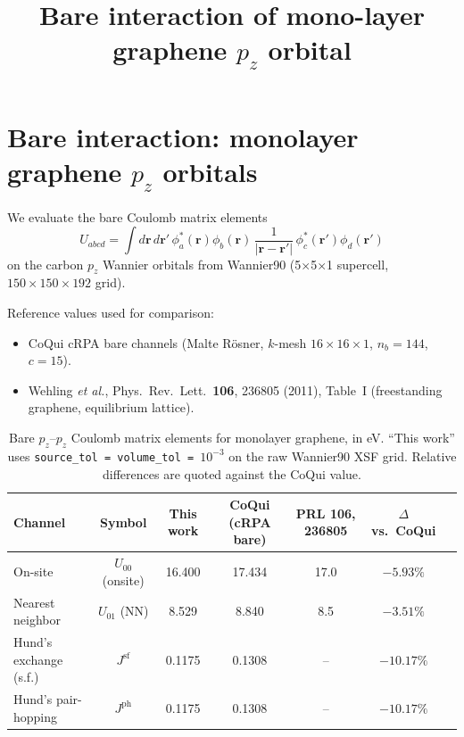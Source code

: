 \documentclass[prb,preprintnumbers,amsmath,amssymb, 11pt]{revtex4}
\newcommand{\V}[1]{\boldsymbol{#1}} %
\begin{document}

\title{Bare interaction of mono-layer graphene $p_z$ orbital}
\author{}

\maketitle

\section{Bare interaction: monolayer graphene $p_z$ orbitals}

We evaluate the bare Coulomb matrix elements
\begin{equation}
  U_{abcd}=\int d\V r\,d\V r'\,\phi_a^*(\V r)\phi_b(\V r)\,\frac{1}{|\V r-\V r'|}\,\phi^*_c(\V r')\phi_d(\V r')
\end{equation}
on the carbon $p_z$ Wannier orbitals from Wannier90 (5$\times$5$\times$1 supercell, $150\times150\times192$ grid). 

Reference values used for comparison:
\begin{itemize}
  \item CoQui cRPA bare channels (Malte R\"osner, $k$-mesh $16\times16\times1$, $n_b{=}144$, $c{=}15$).
  \item Wehling \emph{et al.}, Phys.~Rev.~Lett.~\textbf{106}, 236805 (2011), Table~I (freestanding graphene, equilibrium lattice).
\end{itemize}

\begin{table}[h]
\centering
\caption{Bare $p_z$--$p_z$ Coulomb matrix elements for monolayer graphene, in eV. ``This work'' uses \texttt{source\_tol = volume\_tol = $10^{-3}$} on the raw Wannier90 XSF grid. Relative differences are quoted against the CoQui value.}
\label{tab:mlg_bare}
\begin{tabular}{lcccccc}
\hline\hline
Channel & Symbol & This work & CoQui (cRPA bare) & PRL 106, 236805 & $\Delta$ vs.\ CoQui \\
\hline
On-site                & $U_{00}$ (onsite)   & 16.400 & 17.434 & 17.0 & $-5.93\%$ \\
Nearest neighbor       & $U_{01}$ (NN)       &  8.529 &  8.840 &  8.5 & $-3.51\%$ \\
Hund's exchange (s.f.) & $J^{\mathrm{sf}}$   &  0.1175 & 0.1308 & --   & $-10.17\%$ \\
Hund's pair-hopping    & $J^{\mathrm{ph}}$   &  0.1175 & 0.1308 & --   & $-10.17\%$ \\
\hline\hline
\end{tabular}
\end{table}
\end{document}
